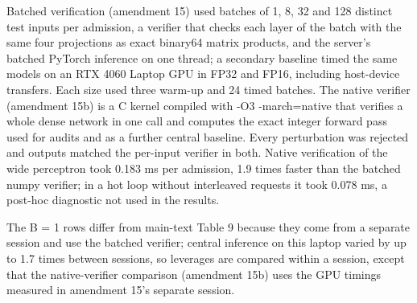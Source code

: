 \documentclass[11pt]{article}
\begin{document}
Batched verification (amendment 15) used batches of 1, 8, 32 and 128 distinct test inputs per admission, a verifier that checks each layer of the batch with the same four projections as exact binary64 matrix products, and the server's batched PyTorch inference on one thread; a secondary baseline timed the same models on an RTX 4060 Laptop GPU in FP32 and FP16, including host-device transfers. Each size used three warm-up and 24 timed batches. The native verifier (amendment 15b) is a C kernel compiled with -O3 -march=native that verifies a whole dense network in one call and computes the exact integer forward pass used for audits and as a further central baseline. Every perturbation was rejected and outputs matched the per-input verifier in both. Native verification of the wide perceptron took 0.183 ms per admission, 1.9 times faster than the batched numpy verifier; in a hot loop without interleaved requests it took 0.078 ms, a post-hoc diagnostic not used in the results.

The B = 1 rows differ from main-text Table 9 because they come from a separate session and use the batched verifier; central inference on this laptop varied by up to 1.7 times between sessions, so leverages are compared within a session, except that the native-verifier comparison (amendment 15b) uses the GPU timings measured in amendment 15's separate session.
\end{document}
